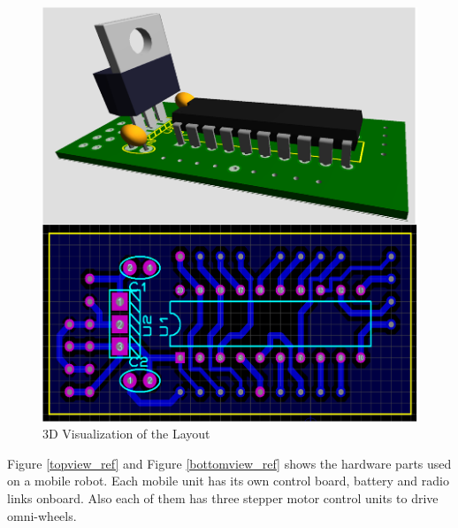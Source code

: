 \begin{figure}[H]
\caption{3D Visualization of the Layout} \label{layout_ref}
\centerline{\includegraphics[scale = 0.45]{sematik-layout}}
\end{figure} 

Figure \ref{topview_ref} and Figure \ref{bottomview_ref} shows the hardware parts used on a mobile robot. Each mobile unit has its own control board, battery and radio links onboard. Also each of them has three stepper motor control units to drive omni-wheels.

